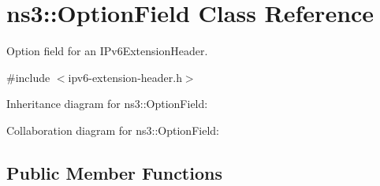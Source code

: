 \hypertarget{classns3_1_1OptionField}{}\section{ns3\+:\+:Option\+Field Class Reference}
\label{classns3_1_1OptionField}


Option field for an I\+Pv6\+Extension\+Header.  




{\ttfamily \#include $<$ipv6-\/extension-\/header.\+h$>$}



Inheritance diagram for ns3\+:\+:Option\+Field\+:


Collaboration diagram for ns3\+:\+:Option\+Field\+:
\subsection*{Public Member Functions}
